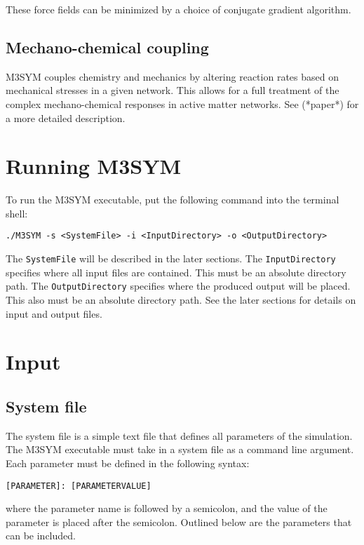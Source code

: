 \documentclass[11pt, oneside]{article}   	%
\begin{document}
\noindent These force fields can be minimized by a choice of conjugate gradient algorithm.

\subsection{Mechano-chemical coupling} 

M3SYM couples chemistry and mechanics by altering reaction rates based on mechanical stresses in a given 
network. This allows for a full treatment of the complex mechano-chemical responses in active matter networks.
See (*paper*) for a more detailed description.

\section{Running M3SYM}

To run the M3SYM executable, put the following command into the terminal shell: \newline \newline \centerline{\texttt{./M3SYM -s <SystemFile> -i <InputDirectory> -o <OutputDirectory>}} \newline \newline The \texttt{SystemFile} will be described in the later sections. \newline\newline  The \texttt{InputDirectory} specifies where all input files are contained. This must be an absolute directory path. The \texttt{OutputDirectory} specifies where the produced output will be placed. This also must be an absolute directory path. See the later sections for details on input and output files.
\section {Input}

\subsection{System file}

The system file is a simple text file that defines all parameters of the simulation. The M3SYM executable must take
 in a system file as a command line argument. \newline\newline Each parameter must be defined in the following syntax: \newline \newline \centerline{\texttt{[PARAMETER]:  [PARAMETERVALUE]}} \newline\newline where the parameter name is followed by a semicolon, and the value of the parameter is placed after the semicolon. Outlined below are the parameters that can be included. 
\end{document}
